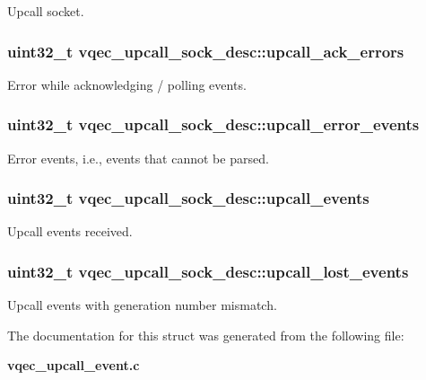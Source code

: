 Upcall socket. 
\subsubsection{\setlength{\rightskip}{0pt plus 5cm}uint32\_\-t \bf{vqec\_\-upcall\_\-sock\_\-desc::upcall\_\-ack\_\-errors}}\label{structvqec__upcall__sock__desc_3d8b6afb08115bf5295f93d277b34f1c}


Error while acknowledging / polling events. 
\subsubsection{\setlength{\rightskip}{0pt plus 5cm}uint32\_\-t \bf{vqec\_\-upcall\_\-sock\_\-desc::upcall\_\-error\_\-events}}\label{structvqec__upcall__sock__desc_ac69a71d4247693f5bbab776c586fc9c}


Error events, i.e., events that cannot be parsed. 
\subsubsection{\setlength{\rightskip}{0pt plus 5cm}uint32\_\-t \bf{vqec\_\-upcall\_\-sock\_\-desc::upcall\_\-events}}\label{structvqec__upcall__sock__desc_8f7201a176ac27b0e5da547bfbe6c6a9}


Upcall events received. 
\subsubsection{\setlength{\rightskip}{0pt plus 5cm}uint32\_\-t \bf{vqec\_\-upcall\_\-sock\_\-desc::upcall\_\-lost\_\-events}}\label{structvqec__upcall__sock__desc_c6278f89d36696bc1d3e48348cc6248d}


Upcall events with generation number mismatch. 

The documentation for this struct was generated from the following file:\begin{CompactItemize}
\item 
\bf{vqec\_\-upcall\_\-event.c}\end{CompactItemize}
